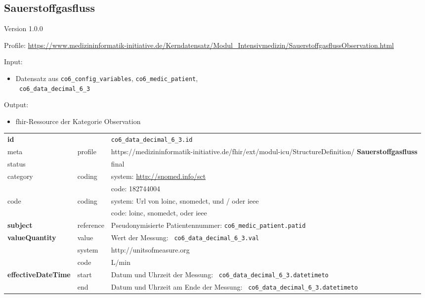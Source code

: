 \subsection{Sauerstoffgasfluss} 
\noindent Version 1.0.0

\noindent Profile: \url{https://www.medizininformatik-initiative.de/Kerndatensatz/Modul_Intensivmedizin/SauerstoffgasflussObservation.html}

\noindent Input:
\begin{itemize}
	\item Datensatz aus \texttt{co6\_config\_variables}, \texttt{co6\_medic\_patient}, \\ \texttt{
co6\_data\_decimal\_6\_3}
\end{itemize}
Output:
\begin{itemize}
        \item \ac{fhir}-Ressource der Kategorie \glqq Observation\grqq{}
\end{itemize}
\begin{longtable}{|l|l|p{7.5cm}|}
        \hline
        \rowcolor{lightgray} \multicolumn{3}{|l|}{Data Mapping (inhaltlich)} \\ \hline
        \textbf{id} &  & \texttt{co6\_data\_decimal\_6\_3.id} \\ \hline
	meta & profile & https://medizininformatik-initiative.de/fhir/ext/modul-icu/StructureDefinition/\textbf{
Sauerstoffgasfluss} \\ \hline 
	status &  & final   \\ \hline 
	category & coding & system: \url{http://snomed.info/sct} \\
\cline{3-3}
	& & code: 182744004 \\ \hline
	code & coding & system: Url von \ac{loinc}, \ac{snomedct}, und / oder \ac{ieee} \\ 
	\cline{3-3} 
	 &  & code: \ac{loinc}, \ac{snomedct}, oder \ac{ieee} \\ \hline
	 \textbf{subject}  & reference & Pseudonymisierte Patientennummer: \texttt{co6\_medic\_patient.patid} \\ \hline
	 \textbf{valueQuantity}  & value & Wert der Messung: \texttt{
co6\_data\_decimal\_6\_3.val} \\
        \cline{2-3}
         & system & http://unitsofmeasure.org \\
         \cline{2-3}
         & code & L/min \\ \hline
     \textbf{effectiveDateTime}  & start & Datum und Uhrzeit der Messung: \texttt{
co6\_data\_decimal\_6\_3.datetimeto} \\
    \cline{2-3}
     & end & Datum und Uhrzeit am Ende der Messung: \texttt{
co6\_data\_decimal\_6\_3.datetimeto} \\ \hline
\end{longtable}


